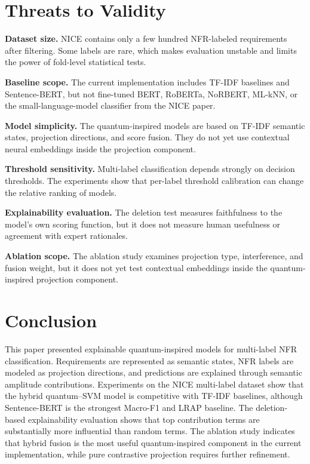\documentclass[runningheads]{llncs}
\begin{document}
\section{Threats to Validity}
\textbf{Dataset size.} NICE contains only a few hundred NFR-labeled
requirements after filtering. Some labels are rare, which makes evaluation
unstable and limits the power of fold-level statistical tests.

\textbf{Baseline scope.} The current implementation includes TF-IDF baselines
and Sentence-BERT, but not fine-tuned BERT, RoBERTa, NoRBERT, ML-kNN, or the
small-language-model classifier from the NICE paper.

\textbf{Model simplicity.} The quantum-inspired models are based on TF-IDF
semantic states, projection directions, and score fusion. They do not yet use
contextual neural embeddings inside the projection component.

\textbf{Threshold sensitivity.} Multi-label classification depends strongly on
decision thresholds. The experiments show that per-label threshold calibration
can change the relative ranking of models.

\textbf{Explainability evaluation.} The deletion test measures faithfulness to
the model's own scoring function, but it does not measure human usefulness or
agreement with expert rationales.

\textbf{Ablation scope.} The ablation study examines projection type,
interference, and fusion weight, but it does not yet test contextual embeddings
inside the quantum-inspired projection component.

\section{Conclusion}
This paper presented explainable quantum-inspired models for multi-label NFR
classification. Requirements are represented as semantic states, NFR labels are
modeled as projection directions, and predictions are explained through
semantic amplitude contributions. Experiments on the NICE multi-label dataset
show that the hybrid quantum--SVM model is competitive with TF-IDF baselines,
although Sentence-BERT is the strongest Macro-F1 and LRAP baseline. The
deletion-based explainability evaluation shows that top contribution terms are
substantially more influential than random terms. The ablation study indicates
that hybrid fusion is the most useful quantum-inspired component in the current
implementation, while pure contrastive projection requires further refinement.
\end{document}
